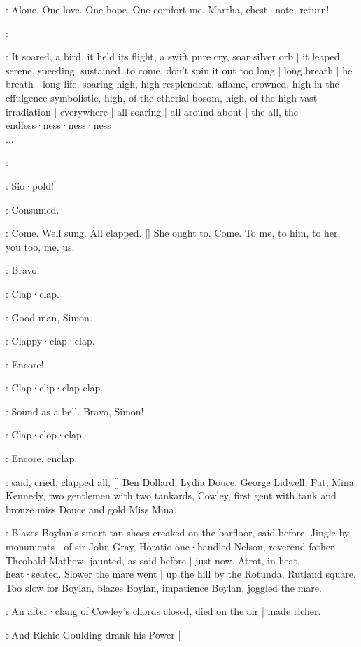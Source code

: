 :
Alone.
One love.
One hope.
One comfort me.
Martha,
chest·note,
return!

\simon:

:
It soared,
a bird,
it held its flight,
a swift pure cry,
soar silver orb |
it leaped serene,
speeding,
sustained,
to come,
don't spin it out too long |
long breath |
he breath |
long life,
soaring high,
high resplendent,
aflame,
crowned,
high in the effulgence symbolistic,
high, of the etherial bosom,
high, of the high vast irradiation |
everywhere |
all soaring |
all around about |
the all,
the endless·ness·ness·ness%
\\
...

\simon:

:
Sio·pold!

\BloomIntA:
Consumed.

\BloomIntA:
Come.
Well sung.
All clapped.
[]
She ought to.
Come.
To me,
to him,
to her,
you too,
me,
us.

\lenehan:
Bravo!

:
Clap·clap.

\dollard:
Good man,
Simon.

:
Clappy·clap·clap.

\cowley:
Encore!

:
Clap·clip·clap clap.

\lenehan:
Sound as a bell.
Bravo,
Simon!

:
Clap·clop·clap.

:
Encore,
enclap,

:
said,
cried,
clapped all,
[]
Ben Dollard,
Lydia Douce,
George
Lidwell,
Pat,
Mina Kennedy,
two gentlemen with two tankards,
Cowley,
first gent with tank and bronze miss Douce
and gold Miss Mina.

:
Blazes Boylan's smart tan shoes creaked on the barfloor,
said before.
Jingle by monuments |
of sir John Gray,
Horatio one·handled Nelson,
reverend father Theobald Mathew,
jaunted,
as said before |
just now.
Atrot,
in heat,
heat·seated.
Slower the mare went |
up the hill by the Rotunda,
Rutland square.
Too slow for Boylan,
blazes Boylan,
impatience Boylan,
joggled the mare.

:
An after·clang of Cowley's chords closed,
died on the air |
made richer.

:
And Richie Goulding drank his Power |


